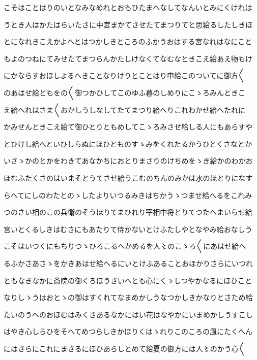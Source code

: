 \documentclass[a4paper,11pt,landscape]{ltjtarticle}
\begin{document}
\par\medskip
こそはことはりのいとなみなめれとおもひたまへなしてなんいとみにくけれは
\par\medskip
うとき人はかたはらいたさに中宮まかてさせたてまつりてと思給るしたしきほ
\par\medskip
とになれきこえかよへとはつかしきところのふかうおはする宮なれはなにこと
\par\medskip
もよのつねにてみせたてまつらんかたしけなくてなむなときこえ給あえ物もけ
\par\medskip
にかならすおほしよるへきことなりけりとことはり申給このついてに御方〱
\par\medskip
のあはせ給ともをの〱御つかひしてこのゆふ暮のしめりにこゝろみんときこ
\par\medskip
え給へれはさま〱おかしうしなしてたてまつり給へりこれわかせ給へたれに
\par\medskip
かみせんときこえ給て御ひとりともめしてこゝろみさせ給しる人にもあらすや
\par\medskip
とひけし給へといひしらぬにほひとものすゝみをくれたるかうひとくさなとか
\par\medskip
いさゝかのとかをわきてあなかちにおとりまさりのけちめをゝき給かのわかお
\par\medskip
ほむふたくさのはいまそとうてさせ給うこむのちんのみかは水のほとりになす
\par\medskip
らへてにしのわたとのゝしたよりいつるみきはちかうゝつませ給へるをこれみ
\par\medskip
つのさい相のこの兵衛のそうほりてまひれり宰相中将とりてつたへまいらせ給
\par\medskip
宮いとくるしきはむさにもあたりて侍かないとけふたしやとなやみ給おなしう
\par\medskip
こそはいつくにもちりつゝひろこるへかめるを人〻のこゝろ〱にあはせ給へ
\par\medskip
るふかさあさゝをかきあはせ給へるにいとけふあることおほかりさらにいつれ
\par\medskip
ともなきなかに斎院の御くろほうさいへとも心にくゝしつやかなるにほひこと
\par\medskip
なりしゝうはおとゝの御はすくれてなまめかしうなつかしきかなりとさため給
\par\medskip
たいのうへのおほむはみくさあるなかにはい花はなやかにいまめかしうすこし
\par\medskip
はやき心しらひをそへてめつらしきかほりくはゝれりこのころの風にたくへん
\par\medskip
にはさらにこれにまさるにほひあらしとめて給夏の御方には人〻のかう心〱
\par\medskip
\end{document}
